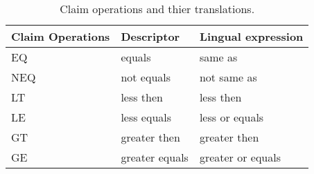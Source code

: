 \begin{table}[h!]
\begin{tabular}{l l l}
 Claim Operations & Descriptor & Lingual expression \\
 \hline
 EQ & equals & same as \\
 NEQ & not equals & not same as \\ 
 LT &  less then & less then \\
 LE & less equals & less or equals \\
 GT & greater then & greater then \\
 GE & greater equals & greater or equals \\
\end{tabular}
\centering
\caption{Claim operations and thier translations.}
\end{table}

